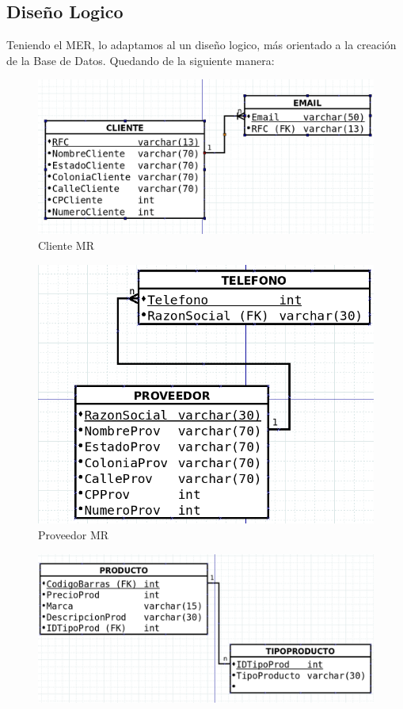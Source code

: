 \documentclass[letter,12pt]{article}
\begin{document}
\subsection{Diseño Logico}
Teniendo el MER, lo adaptamos al un diseño logico, más orientado a la creación de la Base de Datos. Quedando de la siguiente manera:
\begin{center}
\begin{figure}[H]
\includegraphics[scale=.45]{clienteMR.png}
\caption{Cliente MR}
\end{figure}
\begin{figure}[H]
\includegraphics[scale=.45]{proveedorMR.png}
\caption{Proveedor MR}
\end{figure}
\newpage
\begin{figure}[H]
\includegraphics[scale=.45]{productoMR.png}

\end{figure}
\end{center}
\end{document}
